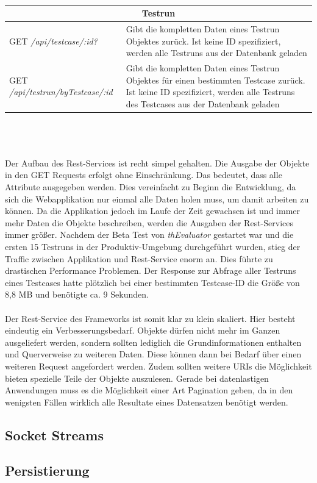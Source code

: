 \\
\\
\\
{\footnotesize
\begin{tabular}{ p{5.5cm} p{9cm} }
  \hline
  \multicolumn{2}{c}{\textbf{Testrun}} \\
  \hline
  GET \textit{/api/testcase/:id?} & Gibt die kompletten Daten eines Testrun Objektes zurück. Ist keine ID spezifiziert, werden alle Testruns aus der Datenbank geladen\vspace{0.2cm}\\
  GET \textit{/api/testrun/byTestcase/:id} & Gibt die kompletten Daten eines Testrun Objektes für einen bestimmten Testcase zurück. Ist keine ID spezifiziert, werden alle Testruns des Testcases aus der Datenbank geladen\vspace{0.2cm}\\

  \hline
\end{tabular}
}
\\
\\
\\
Der Aufbau des Rest-Services ist recht simpel gehalten. Die Ausgabe der Objekte in den GET Requests erfolgt ohne Einschränkung. Das bedeutet, dass alle Attribute ausgegeben werden. Dies vereinfacht zu Beginn die Entwicklung, da sich die Webapplikation nur einmal alle Daten holen muss, um damit arbeiten zu können. Da die Applikation jedoch im Laufe der Zeit gewachsen ist und immer mehr Daten die Objekte beschreiben, werden die Ausgaben der Rest-Services immer größer. Nachdem der Beta Test von \textit{thEvaluator} gestartet war und die ersten 15 Testruns in der Produktiv-Umgebung durchgeführt wurden, stieg der Traffic zwischen Applikation und Rest-Service enorm an. Dies führte zu drastischen Performance Problemen. Der Response zur Abfrage aller Testruns eines Testcases hatte plötzlich bei einer bestimmten Testcase-ID die Größe von 8,8 MB und benötigte ca. 9 Sekunden.\\
\\
Der Rest-Service des Frameworks ist somit klar zu klein skaliert. Hier besteht eindeutig ein Verbesserungsbedarf. Objekte dürfen nicht mehr im Ganzen ausgeliefert werden, sondern sollten lediglich die Grundinformationen enthalten und Querverweise zu weiteren Daten. Diese können dann bei Bedarf über einen weiteren Request angefordert werden. Zudem sollten weitere \Gls{URI}s die Möglichkeit bieten spezielle Teile der Objekte auszulesen. Gerade bei datenlastigen Anwendungen muss es die Möglichkeit einer Art Pagination geben, da in den wenigsten Fällen wirklich alle Resultate eines Datensatzen benötigt werden.

\subsection{Socket Streams}

\subsection{Persistierung}
